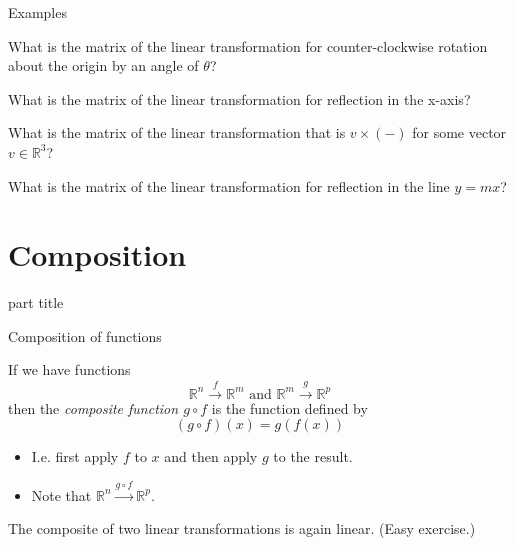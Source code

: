 \documentclass{beamer}
\begin{document}
\begin{frame}{Examples}
\begin{example}
What is the matrix of the linear transformation for counter-clockwise rotation about the origin by an angle of $\theta$?
\end{example}
\begin{example}
What is the matrix of the linear transformation for reflection in the x-axis?
\end{example}
\begin{example}
What is the matrix of the linear transformation that is $v\times (-)$ for some vector $v\in \mathbb{R}^3$?
\end{example}
\begin{example}
What is the matrix of the linear transformation for reflection in the line $y = mx$?
\end{example}
\end{frame}

\section{Composition}

\begin{frame}
\begin{beamercolorbox}[sep=12pt,center]{part title}
\insertsection\par
\end{beamercolorbox}
\end{frame}

\begin{frame}{Composition of functions}
\begin{definition}
If we have functions
\begin{equation*}
\mathbb{R}^n \xrightarrow{f} \mathbb{R}^m \text{ and }\mathbb{R}^m \xrightarrow{g} \mathbb{R}^p
\end{equation*}
then the \emph{composite function $g\circ f$} is the function defined by
\begin{equation*}
(g\circ f)(x) = g(f(x))
\end{equation*}
\end{definition}
\begin{itemize}
	\item I.e. first apply $f$ to $x$ and then apply $g$ to the result.
	\item Note that $\mathbb{R}^n \xrightarrow{g\circ f} \mathbb{R}^p$.
\end{itemize}
\begin{example}
The composite of two linear transformations is again linear.
(Easy exercise.)
\end{example}
\end{frame}
\end{document}
